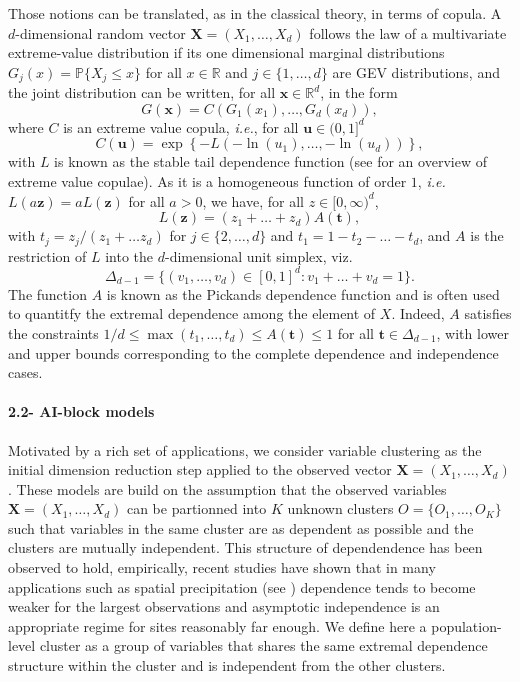 \documentclass[11pt]{article}
\begin{document}
	Those notions can be translated, as in the classical theory, in terms of copula. A $d$-dimensional random vector $\textbf{X} = (X_1, \dots, X_d)$ follows the law of a multivariate extreme-value distribution if its one dimensional marginal distributions $G_j(x) = \mathbb{P}\{X_j \leq x\}$ for all $x \in \mathbb{R}$ and $j \in \{1,\dots,d\}$ are GEV distributions, and the joint distribution can be written, for all $\textbf{x} \in \mathbb{R}^d$, in the form
	\begin{equation}
	\label{eq:ev_cop}
		G(\textbf{x}) = C\left(G_1(x_1), \dots, G_d(x_d)\right),
	\end{equation}
	where $C$ is an extreme value copula, \emph{i.e.}, for all $\textbf{u} \in (0,1]^d$
	\begin{equation*}
		C(\textbf{u}) = \exp\left\{-L\left(-\ln(u_1), \dots, -\ln(u_d)\right)\right\},
	\end{equation*}
	with $L$ is known as the stable tail dependence function (see \cite{gudendorf2010} for an overview of extreme value copulae). As it is a homogeneous function of order $1$, \emph{i.e.} $L(a\textbf{z}) = a L(\textbf{z})$ for all $a > 0$, we have, for all $z \in [0,\infty)^d$,
	\begin{equation*}
		L(\textbf{z}) = (z_1 + \dots + z_d)A(\textbf{t}),
	\end{equation*}
	with $t_j = z_j / (z_1 + \dots z_d)$ for $j \in \{2,\dots,d\}$ and $t_1 = 1-t_2-\dots-t_d$, and $A$ is the restriction of $L$ into the $d$-dimensional unit simplex, viz.
	\begin{equation*}
		\Delta_{d-1} = \{(v_1, \dots, v_d) \in [0,1]^d : v_1 + \dots + v_d = 1\}.
	\end{equation*}
	The function $A$ is known as the Pickands dependence function and is often used to quantitfy the extremal dependence among the element of $X$. Indeed, $A$ satisfies the constraints $1/d \leq \max(t_1, \dots, t_d) \leq A(\textbf{t}) \leq 1$ for all $\textbf{t} \in \Delta_{d-1}$, with lower and upper bounds corresponding to the complete dependence and independence cases.
	
	\paragraph{2.2- AI-block models} Motivated by a rich set of applications, we consider variable clustering as the initial dimension reduction step applied to the observed vector $\textbf{X} = (X_1, \dots, X_d)$. These models are build on the assumption that the observed variables $\textbf{X} = (X_1,\dots, X_d)$ can be partionned into $K$ unknown clusters $O = \{O_1, \dots, O_K\}$ such that variables in the same cluster are as dependent as possible and the clusters are mutually independent. This structure of dependendence has been observed to hold, empirically, recent studies have shown that in many applications such as spatial precipitation (see \cite{le2018dependence, lalancette2021rank}) dependence tends to become weaker for the largest observations and asymptotic independence is an appropriate regime for sites reasonably far enough. We define here a population-level cluster as a group of variables that shares the same extremal dependence structure within the cluster and is independent from the other clusters.
	 
\end{document}
